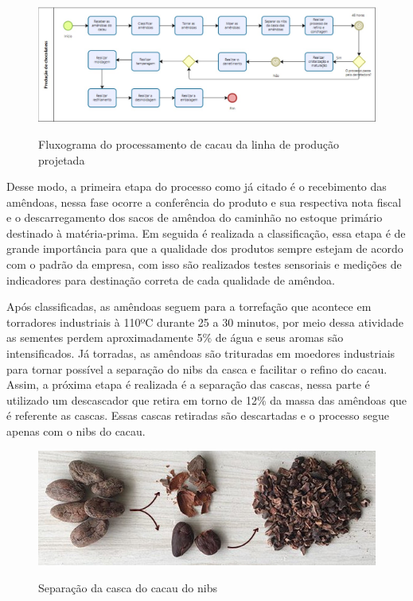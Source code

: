 \documentclass[
	12pt,				%
	openright,			%
	oneside,			%
	a4paper,			%
	english,			%
	french,				%
	spanish,			%
	brazil				%
	]{abntex2}
\begin{document}
\begin{figure}[H]
\begin{center}
\caption{Fluxograma do processamento de cacau da linha de produção projetada}
\includegraphics[scale=0.34]{../../Pictures/fluxo1.jpeg} 
\label{figfluxo}
\end{center}
\end{figure}

Desse modo, a primeira etapa do processo como já citado é o recebimento das amêndoas, nessa fase ocorre a conferência do produto e sua respectiva nota fiscal e o descarregamento dos sacos de amêndoa do caminhão no estoque primário destinado à matéria-prima. Em seguida é realizada a classificação, essa etapa é de grande importância para que a qualidade dos produtos sempre estejam de acordo com o padrão da empresa, com isso são realizados testes sensoriais e medições de indicadores para destinação correta de cada qualidade de amêndoa.

Após classificadas, as amêndoas seguem para a torrefação que acontece em torradores industriais à 110ºC durante 25 a 30 minutos, por meio dessa atividade as sementes perdem aproximadamente 5$\%$ de água e seus aromas são intensificados. Já torradas, as amêndoas são trituradas em moedores industriais para tornar possível a separação do nibs da casca e facilitar o refino do cacau. Assim, a próxima etapa é realizada é a separação das cascas, nessa parte é utilizado um descascador que retira em torno de 12$\%$ da massa das amêndoas que é referente as cascas. Essas cascas retiradas são descartadas e o processo segue apenas com o nibs do cacau.

\begin{figure}[H]
\begin{center}
\caption{Separação da casca do cacau do nibs}
\includegraphics[scale=3]{../../Pictures/nibs1.jpg} 
\label{figtemp}
\end{center}
\end{figure}
\end{document}
